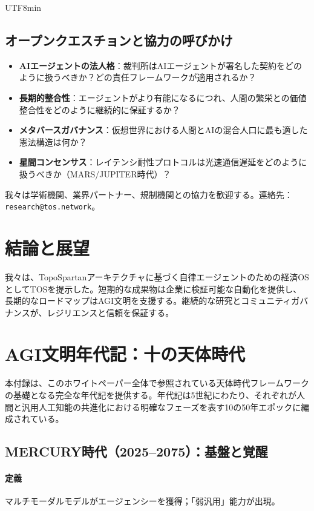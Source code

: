\documentclass[11pt]{article}
\begin{document}
\begin{CJK}{UTF8}{min}
\begin{itemize}[noitemsep]
\subsection{オープンクエスチョンと協力の呼びかけ}

\begin{itemize}[noitemsep]
  \item \textbf{AIエージェントの法人格}：裁判所はAIエージェントが署名した契約をどのように扱うべきか？どの責任フレームワークが適用されるか？
  \item \textbf{長期的整合性}：エージェントがより有能になるにつれ、人間の繁栄との価値整合性をどのように継続的に保証するか？
  \item \textbf{メタバースガバナンス}：仮想世界における人間とAIの混合人口に最も適した憲法構造は何か？
  \item \textbf{星間コンセンサス}：レイテンシ耐性プロトコルは光速通信遅延をどのように扱うべきか（MARS/JUPITER時代）？
\end{itemize}

我々は学術機関、業界パートナー、規制機関との協力を歓迎する。連絡先：\texttt{research@tos.network}。

\section{結論と展望}
我々は、TopoSpartanアーキテクチャに基づく自律エージェントのための経済OSとしてTOSを提示した。短期的な成果物は企業に検証可能な自動化を提供し、長期的なロードマップはAGI文明を支援する。継続的な研究とコミュニティガバナンスが、レジリエンスと信頼を保証する。

\appendix
\newpage

\section{AGI文明年代記：十の天体時代}
\label{appendix:chronicle}

本付録は、このホワイトペーパー全体で参照されている天体時代フレームワークの基礎となる完全な年代記を提供する。年代記は5世紀にわたり、それぞれが人間と汎用人工知能の共進化における明確なフェーズを表す10の50年エポックに編成されている。

\subsection{MERCURY時代（2025–2075）：基盤と覚醒}
\paragraph{定義} マルチモーダルモデルがエージェンシーを獲得；「弱汎用」能力が出現。


\end{itemize}
\end{CJK}
\end{document}
